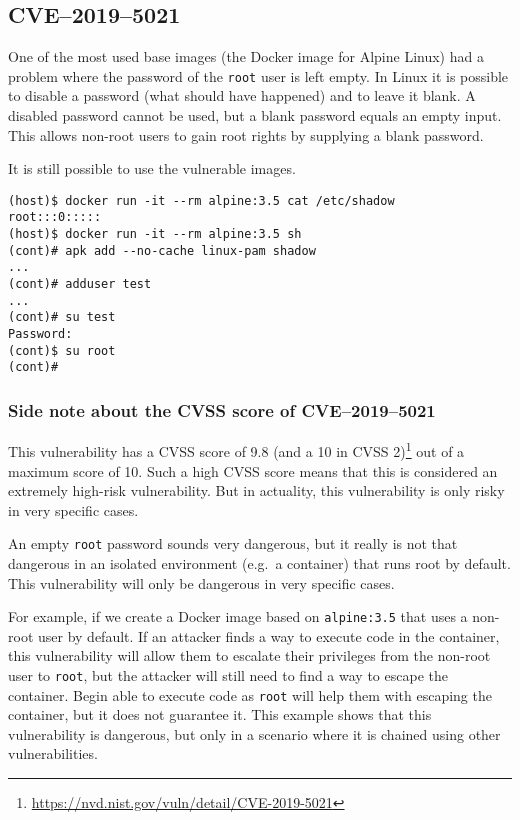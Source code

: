 \subsection{CVE--2019--5021}\label{subsection:CVE-2019-5021}
One of the most used base images (the Docker image for Alpine Linux) had a problem where the password of the \lstinline{root} user is left empty. In Linux it is possible to disable a password (what should have happened) and to leave it blank. A disabled password cannot be used, but a blank password equals an empty input. This allows non-root users to gain root rights by supplying a blank password.

\hfill

It is still possible to use the vulnerable images.
\begin{lstlisting}[caption={The Docker image of Alpine Linux 3.5 has an empty password.},captionpos=b]
(host)$ docker run -it --rm alpine:3.5 cat /etc/shadow
root:::0:::::
(host)$ docker run -it --rm alpine:3.5 sh
(cont)# apk add --no-cache linux-pam shadow
...
(cont)# adduser test
...
(cont)# su test
Password:
(cont)$ su root
(cont)#
\end{lstlisting}

\subsubsection*{Side note about the CVSS score of CVE--2019--5021}

This vulnerability has a CVSS score of 9.8 (and a 10 in CVSS 2)\footnote{\url{https://nvd.nist.gov/vuln/detail/CVE-2019-5021}} out of a maximum score of 10. Such a high CVSS score means that this is considered an extremely high-risk vulnerability. But in actuality, this vulnerability is only risky in very specific cases.

An empty \lstinline{root} password sounds very dangerous, but it really is not that dangerous in an isolated environment (e.g.\ a container) that runs root by default. This vulnerability will only be dangerous in very specific cases.

For example, if we create a Docker image based on \lstinline{alpine:3.5} that uses a non-root user by default. If an attacker finds a way to execute code in the container, this vulnerability will allow them to escalate their privileges from the non-root user to \lstinline{root}, but the attacker will still need to find a way to escape the container. Begin able to execute code as \lstinline{root} will help them with escaping the container, but it does not guarantee it. This example shows that this vulnerability is dangerous, but only in a scenario where it is chained using other vulnerabilities.
